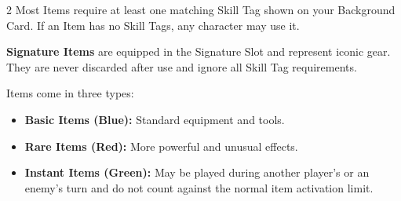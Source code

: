 \begin{multicols}{2}
Most Items require at least one matching Skill Tag shown on your Background Card. If an Item has no Skill Tags, any character may use it.

\textbf{Signature Items} are equipped in the Signature Slot and represent iconic gear. They are never discarded after use and ignore all Skill Tag requirements.

Items come in three types:
\begin{itemize}
  \item \textbf{Basic Items (Blue):} Standard equipment and tools.
  \item \textbf{Rare Items (Red):} More powerful and unusual effects.
  \item \textbf{Instant Items (Green):} May be played during another player's or an enemy's turn and do not count against the normal item activation limit.
\end{itemize}
\end{multicols}
